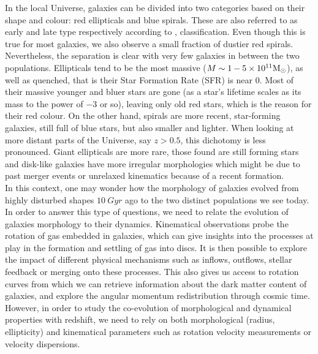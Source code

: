 In the local Universe, galaxies can be divided into two categories based on their shape and colour: red ellipticals and blue spirals. These are also referred to as early and late type respectively according to ,   classification. Even though this is true for most galaxies, we also observe a small fraction of dustier red spirals. Nevertheless, the separation is clear with very few galaxies in between the two populations. Ellipticals tend to be the most massive ($M \sim 1-5 \times 10^{11} \rm{M_\odot}$), as well as quenched, that is their Star Formation Rate (SFR) is near $0$. Most of their massive younger and bluer stars are gone (as a star's lifetime scales as its mass to the power of $-3$ or so), leaving only old red stars, which is the reason for their red colour. On the other hand, spirals are more recent, star-forming galaxies, still full of blue stars, but also smaller and lighter.
When looking at more distant parts of the Universe, say $z > 0.5$, this dichotomy is less pronounced. Giant ellipticals are more rare, those found are still forming stars and disk-like galaxies have more irregular morphologies which might be due to past merger events or unrelaxed kinematics because of a recent formation.\\

In this context, one may wonder how the morphology of galaxies evolved from highly disturbed shapes $\SI{10}{Gyr}$ ago to the two distinct populations we see today. In order to answer this type of questions, we need to relate the evolution of galaxies morphology to their dynamics. Kinematical observations probe the rotation of gas embedded in  galaxies, which can give insights into the processes at play in the formation and settling of gas into discs. It is then possible to explore the impact of different physical mechanisms such as inflows, outflows, stellar feedback or merging onto these processes. This also gives us access to rotation curves from which we can retrieve information about the dark matter content of galaxies, and explore the angular momentum redistribution through cosmic time. However, in order to study the co-evolution of morphological and dynamical properties with redshift, we need to rely on both morphological (radius, ellipticity) and kinematical parameters such as rotation velocity measurements or velocity dispersions. \\

